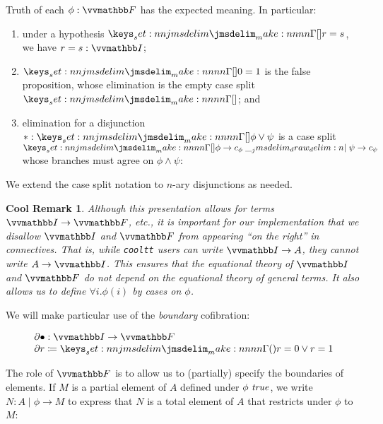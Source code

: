\documentclass[final]{amsart}
\newtheorem{cool}[theorem]{Cool Remark}
\begin{document}
Truth of each $\phi:\COF$ has the expected meaning. In particular:
%
\begin{enumerate}
  \item under a hypothesis $\TpPrf{r=s}$, we have $r=s:\DIM$;

  \item $\TpPrf{0=1}$ is the false proposition, whose elimination is the empty
  case split $\brk{}$; and

  \item elimination for a disjunction $*:\TpPrf{\phi\lor\psi}$ is a case split
  $\brk{\phi \to c_\phi \delimmid \psi \to c_\psi}$ whose branches must agree on
  $\phi\land\psi$:

  \begin{mathparpagebreakable}
  \end{mathparpagebreakable}
\end{enumerate}
%
We extend the case split notation to $n$-ary disjunctions as needed.

\begin{cool}
Although this presentation allows for terms $\DIM\to\COF$, etc., it is important
for our implementation that we disallow $\DIM$ and $\COF$ from appearing ``on
the right'' in connectives. That is, while \texttt{cooltt} users can write
$\DIM\to A$, they cannot write $A\to\DIM$. This ensures that the equational
theory of $\DIM$ and $\COF$ do not depend on the equational theory of general
terms. It also allows us to define $\forall i.\phi(i)$ by cases on $\phi$.
\end{cool}

We will make particular use of the \emph{boundary} cofibration:

\[
  \begin{array}{l}
    \Boundary{\bullet} : \DIM\to\COF\\
    \Boundary{r} \coloneq \prn{r=0 \lor r=1}
  \end{array}
\]

The role of $\COF$ is to allow us to (partially) specify the boundaries of
elements. If $M$ is a partial element of $A$ defined under $\IsTrue{\phi}$, we
write $N : A \mid \phi \to M$ to express that $N$ is a total element of $A$ that
restricts under $\phi$ to $M$:
\end{document}
